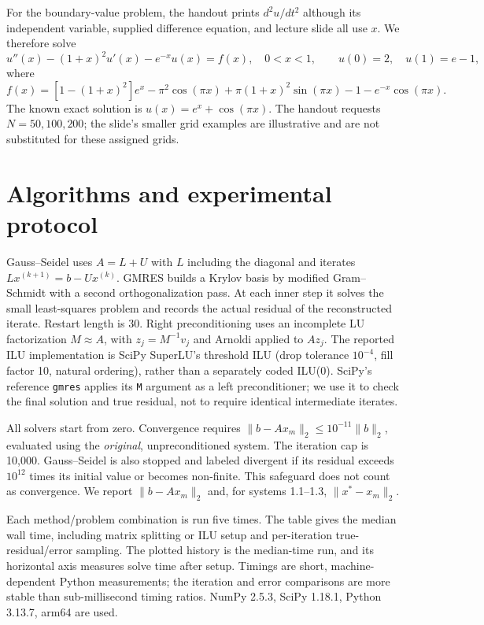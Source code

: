 \documentclass[a4paper,11pt]{article}
\begin{document}
For the boundary-value problem, the handout prints $d^2u/dt^2$ although its independent variable, supplied difference equation, and lecture slide all use $x$. We therefore solve
\begin{equation}
u''(x)-(1+x)^2u'(x)-e^{-x}u(x)=f(x),\quad 0<x<1,\qquad u(0)=2,\quad u(1)=e-1,
\end{equation}
where
\begin{equation}
f(x)=[1-(1+x)^2]e^x-\pi^2\cos(\pi x)+\pi(1+x)^2\sin(\pi x)-1-e^{-x}\cos(\pi x).
\end{equation}
The known exact solution is $u(x)=e^x+\cos(\pi x)$. The handout requests $N=50,100,200$; the slide's smaller grid examples are illustrative and are not substituted for these assigned grids.

\section{Algorithms and experimental protocol}
Gauss--Seidel uses $A=L+U$ with $L$ including the diagonal and iterates $Lx^{(k+1)}=b-Ux^{(k)}$. GMRES builds a Krylov basis by modified Gram--Schmidt with a second orthogonalization pass. At each inner step it solves the small least-squares problem and records the actual residual of the reconstructed iterate. Restart length is 30. Right preconditioning uses an incomplete LU factorization $M\approx A$, with $z_j=M^{-1}v_j$ and Arnoldi applied to $Az_j$. The reported ILU implementation is SciPy SuperLU's threshold ILU (drop tolerance $10^{-4}$, fill factor 10, natural ordering), rather than a separately coded ILU(0). SciPy's reference \texttt{gmres} applies its \texttt{M} argument as a left preconditioner; we use it to check the final solution and true residual, not to require identical intermediate iterates.

All solvers start from zero. Convergence requires $\|b-Ax_m\|_2\leq10^{-11}\|b\|_2$, evaluated using the \emph{original}, unpreconditioned system. The iteration cap is 10,000. Gauss--Seidel is also stopped and labeled divergent if its residual exceeds $10^{12}$ times its initial value or becomes non-finite. This safeguard does not count as convergence. We report $\|b-Ax_m\|_2$ and, for systems 1.1--1.3, $\|x^*-x_m\|_2$.

Each method/problem combination is run five times. The table gives the median wall time, including matrix splitting or ILU setup and per-iteration true-residual/error sampling. The plotted history is the median-time run, and its horizontal axis measures solve time after setup. Timings are short, machine-dependent Python measurements; the iteration and error comparisons are more stable than sub-millisecond timing ratios. NumPy 2.5.3, SciPy 1.18.1, Python 3.13.7, arm64 are used.
\end{document}

